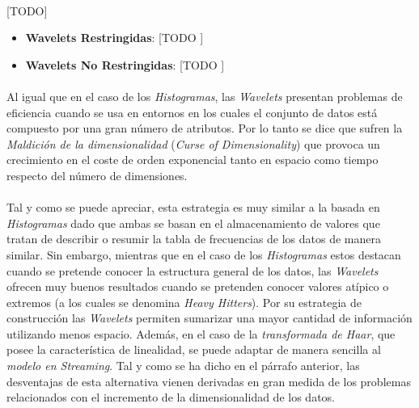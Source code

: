 \documentclass{subfiles}
\begin{document}
        \paragraph{}
        [TODO]
        
        \begin{itemize}

          \item \textbf{Wavelets Restringidas}: [TODO ]

          \item \textbf{Wavelets No Restringidas}: [TODO ]

        \end{itemize}

        \paragraph{}
        Al igual que en el caso de los \emph{Histogramas}, las \emph{Wavelets} presentan problemas de eficiencia cuando se usa en entornos en los cuales el conjunto de datos está compuesto por una gran número de atributos. Por lo tanto se dice que sufren la \emph{Maldición de la dimensionalidad} (\emph{Curse of Dimensionality}) que provoca un crecimiento en el coste de orden exponencial tanto en espacio como tiempo respecto del número de dimensiones.

        \paragraph{}
        Tal y como se puede apreciar, esta estrategia es muy similar a la basada en \emph{Histogramas} dado que ambas se basan en el almacenamiento de valores que tratan de describir o resumir la tabla de frecuencias de los datos de manera similar. Sin embargo, mientras que en el caso de los \emph{Histogramas} estos destacan cuando se pretende conocer la estructura general de los datos, las \emph{Wavelets} ofrecen muy buenos resultados cuando se pretenden conocer valores atípico o extremos (a los cuales se denomina \emph{Heavy Hitters}). Por su estrategia de construcción las \emph{Wavelets} permiten sumarizar una mayor cantidad de información utilizando menos espacio. Además, en el caso de la \emph{transformada de Haar}, que posee la característica de linealidad, se puede adaptar de manera sencilla al \emph{modelo en Streaming}. Tal y como se ha dicho en el párrafo anterior, las desventajas de esta alternativa vienen derivadas en gran medida de los problemas relacionados con el incremento de la dimensionalidad de los datos.
\end{document}
